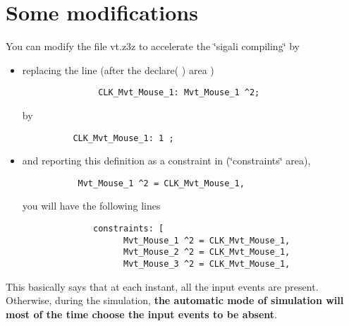 \section{Some modifications}\label{note}
You can modify the file vt.z3z to accelerate the \char`\"{}sigali compiling\char`\"{} by\begin{itemize}
\item replacing the line (after the declare( ) area ) 

\footnotesize\begin{verbatim}               CLK_Mvt_Mouse_1: Mvt_Mouse_1 ^2; 
        \end{verbatim}
\normalsize
 by 

\footnotesize\begin{verbatim}	       CLK_Mvt_Mouse_1: 1 ;
        \end{verbatim}
\normalsize
\end{itemize}


\begin{itemize}
\item and reporting this definition as a constraint in (\char`\"{}constraints\char`\"{} area), 

\footnotesize\begin{verbatim}	        Mvt_Mouse_1 ^2 = CLK_Mvt_Mouse_1,
        \end{verbatim}
\normalsize
 you will have the following lines 

\footnotesize\begin{verbatim}              constraints: [
                    Mvt_Mouse_1 ^2 = CLK_Mvt_Mouse_1,
                    Mvt_Mouse_2 ^2 = CLK_Mvt_Mouse_1,
                    Mvt_Mouse_3 ^2 = CLK_Mvt_Mouse_1,
        \end{verbatim}
\normalsize
\end{itemize}


This basically says that at each instant, all the input events are present. Otherwise, during the simulation, {\bf  the automatic mode of simulation will most of the time choose the input events to be absent}. 